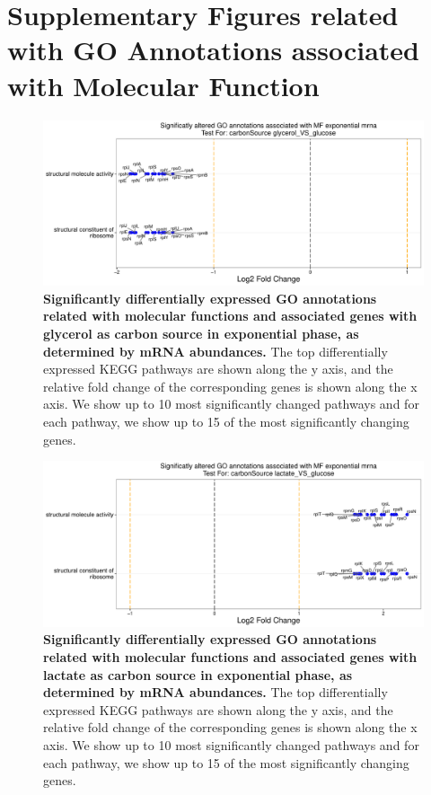 \documentclass[a4paper]{article}
\begin{document}
\section*{Supplementary Figures related with GO Annotations associated with Molecular Function}

\begin{figure}[!htb]
	\includegraphics[width=1.0\textwidth]{../../d_figures/mf_n_01.pdf}
	\caption[Significantly altered GO annotations associated with molecular functions for mRNA samples in exponential phase tested for glycerol against glucose]
	{\textbf{Significantly differentially expressed GO annotations related with molecular functions and associated genes with glycerol as carbon source in exponential phase, as determined by mRNA abundances.} The top differentially expressed KEGG pathways are shown along the y axis, and the relative fold change of the corresponding genes is shown along the x axis. We show up to 10 most significantly changed pathways and for each pathway, we show up to 15 of the most significantly changing genes.}
\end{figure}

\clearpage
\begin{figure}
	\includegraphics[width=1.0\textwidth]{../../d_figures/mf_n_02.pdf}
	\caption[Significantly altered GO annotations associated with molecular functions for mRNA samples in exponential phase tested for lactate against glucose]
	{\textbf{Significantly differentially expressed GO annotations related with molecular functions and associated genes with lactate as carbon source in exponential phase, as determined by mRNA abundances.} The top differentially expressed KEGG pathways are shown along the y axis, and the relative fold change of the corresponding genes is shown along the x axis. We show up to 10 most significantly changed pathways and for each pathway, we show up to 15 of the most significantly changing genes.}
\end{figure}
\end{document}
